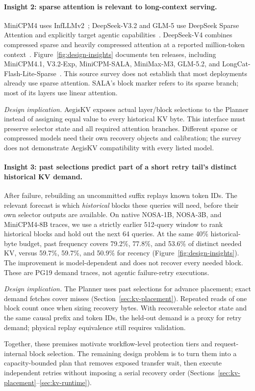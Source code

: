 \paragraph{Insight 2: sparse attention is relevant to long-context serving.}
MiniCPM4 uses InfLLMv2~\cite{minicpm4model}; DeepSeek-V3.2 and GLM-5
use DeepSeek Sparse Attention and explicitly target agentic
capabilities~\cite{deepseek2025v32model,zai2026glm5model}.
DeepSeek-V4 combines compressed sparse and heavily compressed attention
at a reported million-token context~\cite{deepseek2026v4model}.
Figure~\ref{fig:design-insights}
documents ten releases, including MiniCPM4.1,
V3.2-Exp, MiniCPM-SALA, MiniMax-M3, GLM-5.2, and
LongCat-Flash-Lite-Sparse~\cite{openbmb2025minicpm41,deepseek2025v32exp,
openbmb2026sala,minimax2026m3,zai2026glm52,longcat2026sparse}.
This source survey does not establish that most deployments already use
sparse attention. SALA's block marker refers to its sparse branch;
most of its layers use linear attention.

\emph{Design implication.} AegisKV exposes actual layer/block selections
to the Planner instead of assigning equal value to every historical
KV byte. This interface must preserve selector state and all required
attention branches. Different sparse or compressed models need their
own recovery objects and calibration; the survey does not demonstrate
AegisKV compatibility with every listed model.

\paragraph{Insight 3: past selections predict part of a short retry
tail's distinct historical KV demand.}
After failure, rebuilding an uncommitted suffix replays known token IDs.
The relevant forecast is which \emph{historical} blocks these queries
will need, before their own selector outputs are available. On native
NOSA-1B, NOSA-3B, and MiniCPM4-8B traces, we use a strictly earlier
512-query window to rank historical blocks and hold out the next
64 queries. At the same 40\% historical-byte budget, past frequency
covers 79.2\%, 77.8\%, and 53.6\% of distinct needed KV, versus
59.7\%, 59.7\%, and 50.9\% for recency
(Figure~\ref{fig:design-insights}).
The improvement is model-dependent and does not recover every needed
block. These are PG19 demand traces, not agentic failure-retry executions.

\emph{Design implication.} The Planner uses past selections for advance
placement; exact demand fetches cover misses (Section~\ref{sec:kv-placement}).
Repeated reads of one block count once when sizing recovery bytes.
With recoverable selector state and the same causal prefix and token
IDs, the held-out demand is a proxy for retry demand; physical replay
equivalence still requires validation.

Together, these premises motivate workflow-level protection tiers and
request-internal block selection. The remaining design problem is to
turn them into a capacity-bounded plan that removes exposed transfer
wait, then execute independent retries without imposing a serial
recovery order (Sections~\ref{sec:kv-placement}--\ref{sec:kv-runtime}).
